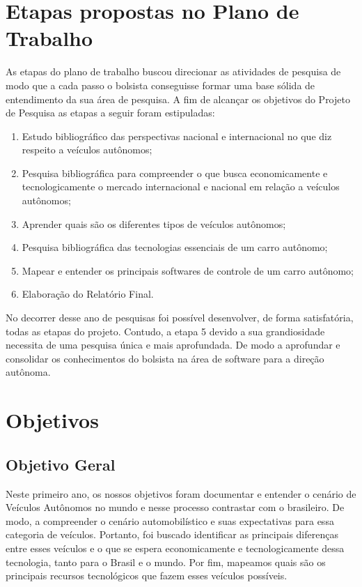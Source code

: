 
\chapter{Etapas propostas no Plano de Trabalho} \label{Etapas}
As etapas do plano de trabalho buscou direcionar as atividades de pesquisa de modo que a cada passo o bolsista conseguisse formar uma base sólida de entendimento da sua área de pesquisa. A fim de alcançar os objetivos do Projeto de Pesquisa as etapas a seguir foram estipuladas:
\begin{enumerate}
    \item  Estudo bibliográfico das perspectivas nacional e internacional no que diz respeito a veículos autônomos;
    \item  Pesquisa bibliográfica para compreender o que busca economicamente e tecnologicamente o mercado internacional e nacional em relação a veículos autônomos;
    \item Aprender quais são os diferentes tipos de veículos autônomos;
    \item Pesquisa bibliográfica das tecnologias essenciais de um carro autônomo;
    \item Mapear e entender os principais softwares de controle de um carro autônomo;
    \item Elaboração do Relatório Final.
\end{enumerate}

No decorrer desse ano de pesquisas foi possível desenvolver, de forma satisfatória, todas as etapas do projeto. Contudo, a etapa 5 devido a sua grandiosidade necessita de uma pesquisa única e mais aprofundada. De modo a aprofundar e consolidar os conhecimentos do bolsista na área de software para a direção autônoma.

\newpage
\chapter{Objetivos} \label{Objetivos}
\section{Objetivo Geral}\label{Objetivo Geral}
Neste primeiro ano, os nossos objetivos foram documentar e entender o cenário de Veículos Autônomos no mundo e nesse processo contrastar com o brasileiro. De modo, a compreender o cenário automobilístico e suas expectativas para essa categoria de veículos. Portanto, foi buscado identificar as principais diferenças entre esses veículos e o que se espera economicamente e tecnologicamente dessa tecnologia, tanto para o Brasil e o mundo. Por fim, mapeamos quais são os principais recursos tecnológicos que fazem esses veículos possíveis. 

